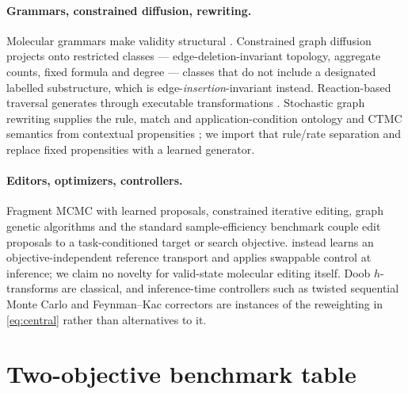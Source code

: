 \paragraph{Grammars, constrained diffusion, rewriting.}
Molecular grammars make validity structural \citep{kajino2019mhg,guo2022grammar}. Constrained graph diffusion projects onto restricted classes --- edge-deletion-invariant topology, aggregate counts, fixed formula and degree \citep{madeira2024construct,sharma2024prodigy,ruizbotella2026cocograph} --- classes that do not include a designated labelled substructure, which is edge-\emph{insertion}-invariant instead. Reaction-based traversal generates through executable transformations \citep{koziarski2024rgfn}. Stochastic graph rewriting supplies the rule, match and application-condition ontology and CTMC semantics from contextual propensities \citep{danos2015thermodynamic,behr2021rewriting}; we import that rule/rate separation and replace fixed propensities with a learned generator.

\paragraph{Editors, optimizers, controllers.}
Fragment MCMC with learned proposals, constrained iterative editing, graph genetic algorithms and the standard sample-efficiency benchmark \citep{xie2021mars,fu2021mimosa,jensen2019graphga,gao2022pmo} couple edit proposals to a task-conditioned target or search objective. \method{} instead learns an objective-independent reference transport and applies swappable control at inference; we claim no novelty for valid-state molecular editing itself. Doob $h$-transforms are classical, and inference-time controllers such as twisted sequential Monte Carlo and Feynman--Kac correctors \citep{wu2023twisted,skreta2025feynman} are instances of the reweighting in \eqref{eq:central} rather than alternatives to it.

\section{Two-objective benchmark table}
\label{app:multiobjtable}

